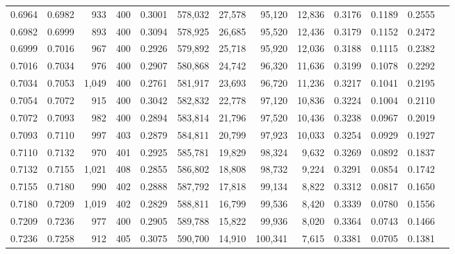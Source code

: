 \begin{tabular}{rrrrrrrrrrrrr}
0.6964 & 0.6982 &    933 & 400 &                                     0.3001 & 578,032 &  27,578 &  95,120 &  12,836 & 0.3176 & 0.1189 & 0.2555 \\
0.6982 & 0.6999 &    893 & 400 &                                     0.3094 & 578,925 &  26,685 &  95,520 &  12,436 & 0.3179 & 0.1152 & 0.2472 \\
0.6999 & 0.7016 &    967 & 400 &                                     0.2926 & 579,892 &  25,718 &  95,920 &  12,036 & 0.3188 & 0.1115 & 0.2382 \\
0.7016 & 0.7034 &    976 & 400 &                                     0.2907 & 580,868 &  24,742 &  96,320 &  11,636 & 0.3199 & 0.1078 & 0.2292 \\
0.7034 & 0.7053 &  1,049 & 400 &                                     0.2761 & 581,917 &  23,693 &  96,720 &  11,236 & 0.3217 & 0.1041 & 0.2195 \\
0.7054 & 0.7072 &    915 & 400 &                                     0.3042 & 582,832 &  22,778 &  97,120 &  10,836 & 0.3224 & 0.1004 & 0.2110 \\
0.7072 & 0.7093 &    982 & 400 &                                     0.2894 & 583,814 &  21,796 &  97,520 &  10,436 & 0.3238 & 0.0967 & 0.2019 \\
0.7093 & 0.7110 &    997 & 403 &                                     0.2879 & 584,811 &  20,799 &  97,923 &  10,033 & 0.3254 & 0.0929 & 0.1927 \\
0.7110 & 0.7132 &    970 & 401 &                                     0.2925 & 585,781 &  19,829 &  98,324 &   9,632 & 0.3269 & 0.0892 & 0.1837 \\
0.7132 & 0.7155 &  1,021 & 408 &                                     0.2855 & 586,802 &  18,808 &  98,732 &   9,224 & 0.3291 & 0.0854 & 0.1742 \\
0.7155 & 0.7180 &    990 & 402 &                                     0.2888 & 587,792 &  17,818 &  99,134 &   8,822 & 0.3312 & 0.0817 & 0.1650 \\
0.7180 & 0.7209 &  1,019 & 402 &                                     0.2829 & 588,811 &  16,799 &  99,536 &   8,420 & 0.3339 & 0.0780 & 0.1556 \\
0.7209 & 0.7236 &    977 & 400 &                                     0.2905 & 589,788 &  15,822 &  99,936 &   8,020 & 0.3364 & 0.0743 & 0.1466 \\
0.7236 & 0.7258 &    912 & 405 &                                     0.3075 & 590,700 &  14,910 & 100,341 &   7,615 & 0.3381 & 0.0705 & 0.1381 \\

\end{tabular}
